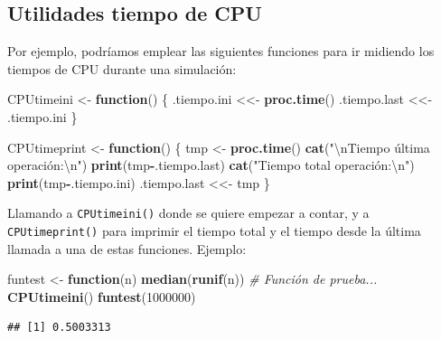 \documentclass[
]{book}
\newenvironment{Shaded}{\begin{snugshade}}{\end{snugshade}}
\newcommand{\CharTok}[1]{\textcolor[rgb]{0.31,0.60,0.02}{#1}}
\newcommand{\CommentTok}[1]{\textcolor[rgb]{0.56,0.35,0.01}{\textit{#1}}}
\newcommand{\ControlFlowTok}[1]{\textcolor[rgb]{0.13,0.29,0.53}{\textbf{#1}}}
\newcommand{\DecValTok}[1]{\textcolor[rgb]{0.00,0.00,0.81}{#1}}
\newcommand{\KeywordTok}[1]{\textcolor[rgb]{0.13,0.29,0.53}{\textbf{#1}}}
\newcommand{\NormalTok}[1]{#1}
\newcommand{\OperatorTok}[1]{\textcolor[rgb]{0.81,0.36,0.00}{\textbf{#1}}}
\newcommand{\StringTok}[1]{\textcolor[rgb]{0.31,0.60,0.02}{#1}}
\theoremstyle{break}
\theoremstyle{definition}
\theoremstyle{definition}
\theoremstyle{definition}
\theoremstyle{remark}
\begin{document}
\hypertarget{utilidades-tiempo-de-cpu}{%
\subsection{Utilidades tiempo de CPU}\label{utilidades-tiempo-de-cpu}}

Por ejemplo, podríamos emplear las siguientes funciones para
ir midiendo los tiempos de CPU durante una simulación:

\begin{Shaded}
\begin{Highlighting}[]
\NormalTok{CPUtimeini <-}\StringTok{ }\ControlFlowTok{function}\NormalTok{() \{}
\NormalTok{  .tiempo.ini <<-}\StringTok{ }\KeywordTok{proc.time}\NormalTok{()}
\NormalTok{  .tiempo.last <<-}\StringTok{ }\NormalTok{.tiempo.ini}
\NormalTok{\}}

\NormalTok{CPUtimeprint <-}\StringTok{ }\ControlFlowTok{function}\NormalTok{() \{}
\NormalTok{  tmp <-}\StringTok{ }\KeywordTok{proc.time}\NormalTok{()}
  \KeywordTok{cat}\NormalTok{(}\StringTok{"}\CharTok{\textbackslash{}n}\StringTok{Tiempo última operación:}\CharTok{\textbackslash{}n}\StringTok{"}\NormalTok{)}
  \KeywordTok{print}\NormalTok{(tmp}\OperatorTok{-}\NormalTok{.tiempo.last)}
  \KeywordTok{cat}\NormalTok{(}\StringTok{"Tiempo total operación:}\CharTok{\textbackslash{}n}\StringTok{"}\NormalTok{)}
  \KeywordTok{print}\NormalTok{(tmp}\OperatorTok{-}\NormalTok{.tiempo.ini)}
\NormalTok{  .tiempo.last <<-}\StringTok{ }\NormalTok{tmp}
\NormalTok{\}}
\end{Highlighting}
\end{Shaded}

Llamando a \texttt{CPUtimeini()} donde se quiere empezar a contar,
y a \texttt{CPUtimeprint()} para imprimir el tiempo total
y el tiempo desde la última llamada a una de estas funciones.
Ejemplo:

\begin{Shaded}
\begin{Highlighting}[]
\NormalTok{funtest <-}\StringTok{ }\ControlFlowTok{function}\NormalTok{(n) }\KeywordTok{median}\NormalTok{(}\KeywordTok{runif}\NormalTok{(n)) }\CommentTok{# Función de prueba...}
\KeywordTok{CPUtimeini}\NormalTok{()}
\KeywordTok{funtest}\NormalTok{(}\DecValTok{1000000}\NormalTok{)}
\end{Highlighting}
\end{Shaded}

\begin{verbatim}
## [1] 0.5003313
\end{verbatim}
\end{document}
